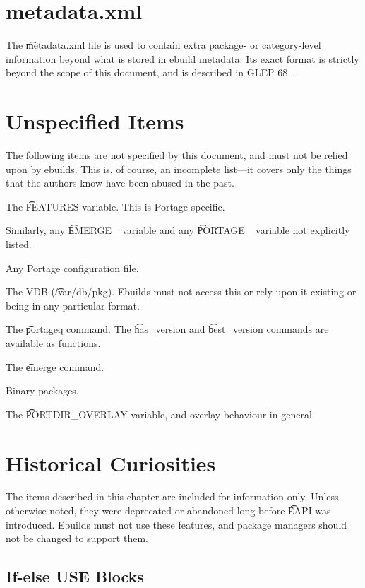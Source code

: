 \chapter{metadata.xml}
\label{sec:metadata-xml}

The \t{metadata.xml} file is used to contain extra package- or category-level information beyond
what is stored in ebuild metadata. Its exact format is strictly beyond the scope of this document,
and is described in GLEP 68~\cite{Glep68}.

\chapter{Unspecified Items}

The following items are not specified by this document, and must not be relied upon by ebuilds.
This is, of course, an incomplete list---it covers only the things that the authors know have
been abused in the past.

\begin{compactitem}
\item The \t{FEATURES} variable. This is Portage specific.
\item Similarly, any \t{EMERGE_} variable and any \t{PORTAGE_} variable not explicitly listed.
\item Any Portage configuration file.
\item The VDB (\t{/var/db/pkg}). Ebuilds must not access this or rely upon it existing or being
    in any particular format.
\item The \t{portageq} command. The \t{has_version} and \t{best_version} commands are
    available as functions.
\item The \t{emerge} command.
\item Binary packages.
\item The \t{PORTDIR_OVERLAY} variable, and overlay behaviour in general.
\end{compactitem}

\chapter{Historical Curiosities}

The items described in this chapter are included for information only. Unless otherwise noted,
they were deprecated or abandoned long before \t{EAPI} was introduced. Ebuilds must not use these
features, and package managers should not be changed to support them.

\section{If-else USE Blocks}

